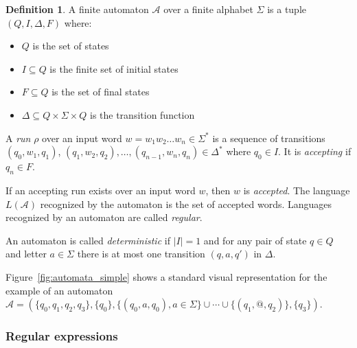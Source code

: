 \documentclass[12px]{article}
\theoremstyle{definition}
\newtheorem{definition}{Definition}
\begin{document}
      \begin{definition}
        A finite automaton $\mathcal{A}$ over a finite alphabet $\Sigma$ is a
        tuple $(Q, I, \Delta, F)$ where:
          \begin{itemize}
            \item $Q$ is the set of states
            \item $I \subseteq Q$ is the finite set of initial states
            \item $F \subseteq Q$ is the set of final states
            \item $\Delta \subseteq Q \times \Sigma \times Q$ is the transition
              function
          \end{itemize}

          A \textit{run} $\rho$ over an input word $w= w_1 w_2 \ldots w_n \in
          \Sigma^*$ is a sequence of transitions $(q_0, w_1, q_1)$, $(q_1, w_2,
          q_2), \ldots, (q_{n-1}, w_n, q_n) \in \Delta^*$ where $q_0 \in I$. It
          is \textit{accepting} if $q_n \in F$.

          If an accepting run exists over an input word $w$, then $w$ is
          \textit{accepted}. The language $L(\mathcal{A})$ recognized by the
          automaton is the set of accepted words. Languages recognized by an
          automaton are called \textit{regular}.

          An automaton is called \textit{deterministic} if $|I| = 1$ and for any
          pair of state $q \in Q$ and letter $a \in \Sigma$ there is at most one
          transition $(q, a, q')$ in $\Delta$.
        \end{definition}

        Figure~\ref{fig:automata_simple} shows a standard visual representation
        for the example of an automaton $\mathcal{A} = (\{q_0, q_1, q_2, q_3\},
        \{q_0\}, \{(q_0, a, q_0), a \in \Sigma\} \cup \cdots \cup \{(q_1,
        \texttt{@}, q_2)\},\{q_3\})$.

      \subsubsection{Regular expressions}%
        \label{sec:def:regex}
\end{document}
